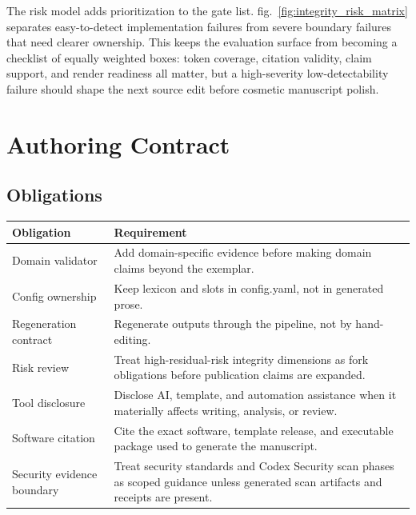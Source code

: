 \documentclass[
]{article}
\newcounter{none} %
\begin{document}
The risk model adds prioritization to the gate list.
fig.~\ref{fig:integrity_risk_matrix} separates easy-to-detect
implementation failures from severe boundary failures that need clearer
ownership. This keeps the evaluation surface from becoming a checklist
of equally weighted boxes: token coverage, citation validity, claim
support, and render readiness all matter, but a high-severity
low-detectability failure should shape the next source edit before
cosmetic manuscript polish.

\newpage

\section{Authoring Contract}\label{sec:authoring_contract}

\subsection{Obligations}\label{obligations}

{\def\LTcaptype{none} %
\begin{longtable}[]{@{}
  >{\raggedright\arraybackslash}p{}
  >{\raggedright\arraybackslash}p{}@{}}
\toprule\noalign{}
\begin{minipage}[b]{\linewidth}\raggedright
Obligation
\end{minipage} & \begin{minipage}[b]{\linewidth}\raggedright
Requirement
\end{minipage} \\
\midrule\noalign{}
\endhead
\bottomrule\noalign{}
\endlastfoot
Domain validator & Add domain-specific evidence before making domain
claims beyond the exemplar. \\
Config ownership & Keep lexicon and slots in config.yaml, not in
generated prose. \\
Regeneration contract & Regenerate outputs through the pipeline, not by
hand-editing. \\
Risk review & Treat high-residual-risk integrity dimensions as fork
obligations before publication claims are expanded. \\
Tool disclosure & Disclose AI, template, and automation assistance when
it materially affects writing, analysis, or review. \\
Software citation & Cite the exact software, template release, and
executable package used to generate the manuscript. \\
Security evidence boundary & Treat security standards and Codex Security
scan phases as scoped guidance unless generated scan artifacts and
receipts are present. \\
\end{longtable}
}
\end{document}
